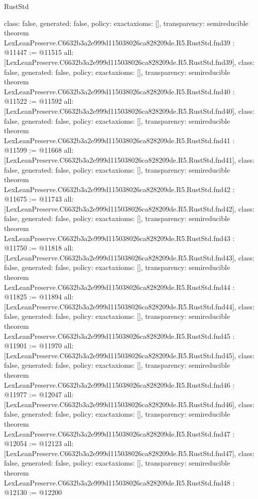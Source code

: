 \begin{lexlean}{RustStd}
\begin{coremodule}
{  class: false,
  generated: false,
  policy: exact{axioms: []},
  transparency: semireducible
}
theorem LexLeanPreserve.C6632b3a2e999d115038026ca828209de.R5.RustStd.fnd39 : @11447 := @11515 {
  all: [LexLeanPreserve.C6632b3a2e999d115038026ca828209de.R5.RustStd.fnd39],
  class: false,
  generated: false,
  policy: exact{axioms: []},
  transparency: semireducible
}
theorem LexLeanPreserve.C6632b3a2e999d115038026ca828209de.R5.RustStd.fnd40 : @11522 := @11592 {
  all: [LexLeanPreserve.C6632b3a2e999d115038026ca828209de.R5.RustStd.fnd40],
  class: false,
  generated: false,
  policy: exact{axioms: []},
  transparency: semireducible
}
theorem LexLeanPreserve.C6632b3a2e999d115038026ca828209de.R5.RustStd.fnd41 : @11599 := @11668 {
  all: [LexLeanPreserve.C6632b3a2e999d115038026ca828209de.R5.RustStd.fnd41],
  class: false,
  generated: false,
  policy: exact{axioms: []},
  transparency: semireducible
}
theorem LexLeanPreserve.C6632b3a2e999d115038026ca828209de.R5.RustStd.fnd42 : @11675 := @11743 {
  all: [LexLeanPreserve.C6632b3a2e999d115038026ca828209de.R5.RustStd.fnd42],
  class: false,
  generated: false,
  policy: exact{axioms: []},
  transparency: semireducible
}
theorem LexLeanPreserve.C6632b3a2e999d115038026ca828209de.R5.RustStd.fnd43 : @11750 := @11818 {
  all: [LexLeanPreserve.C6632b3a2e999d115038026ca828209de.R5.RustStd.fnd43],
  class: false,
  generated: false,
  policy: exact{axioms: []},
  transparency: semireducible
}
theorem LexLeanPreserve.C6632b3a2e999d115038026ca828209de.R5.RustStd.fnd44 : @11825 := @11894 {
  all: [LexLeanPreserve.C6632b3a2e999d115038026ca828209de.R5.RustStd.fnd44],
  class: false,
  generated: false,
  policy: exact{axioms: []},
  transparency: semireducible
}
theorem LexLeanPreserve.C6632b3a2e999d115038026ca828209de.R5.RustStd.fnd45 : @11901 := @11970 {
  all: [LexLeanPreserve.C6632b3a2e999d115038026ca828209de.R5.RustStd.fnd45],
  class: false,
  generated: false,
  policy: exact{axioms: []},
  transparency: semireducible
}
theorem LexLeanPreserve.C6632b3a2e999d115038026ca828209de.R5.RustStd.fnd46 : @11977 := @12047 {
  all: [LexLeanPreserve.C6632b3a2e999d115038026ca828209de.R5.RustStd.fnd46],
  class: false,
  generated: false,
  policy: exact{axioms: []},
  transparency: semireducible
}
theorem LexLeanPreserve.C6632b3a2e999d115038026ca828209de.R5.RustStd.fnd47 : @12054 := @12123 {
  all: [LexLeanPreserve.C6632b3a2e999d115038026ca828209de.R5.RustStd.fnd47],
  class: false,
  generated: false,
  policy: exact{axioms: []},
  transparency: semireducible
}
theorem LexLeanPreserve.C6632b3a2e999d115038026ca828209de.R5.RustStd.fnd48 : @12130 := @12200 {
}
\end{coremodule}
\end{lexlean}
